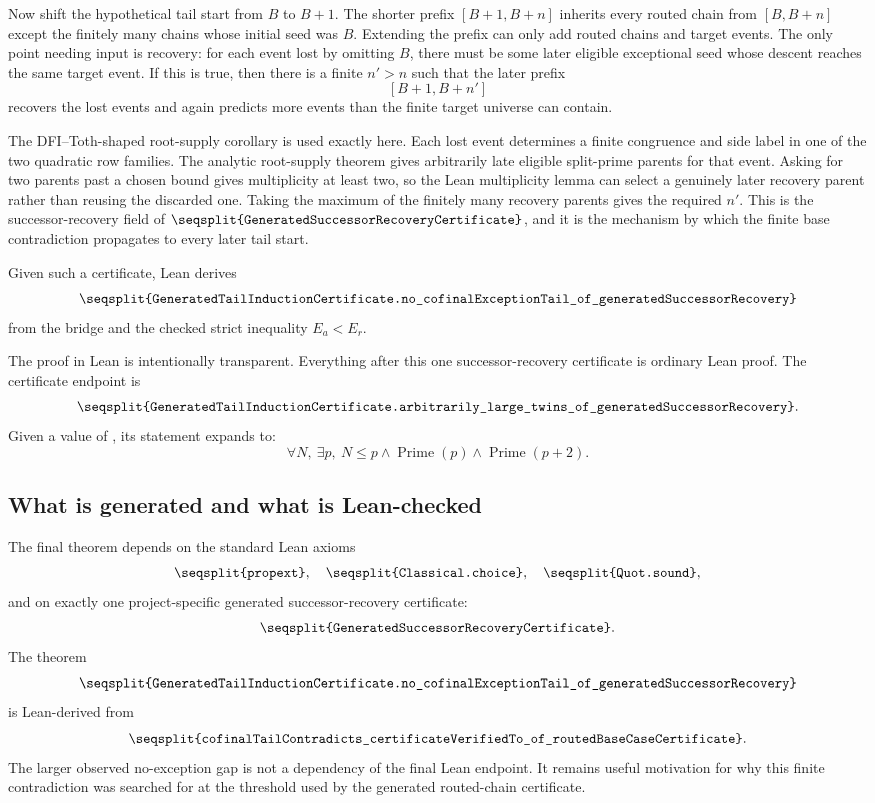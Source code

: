 \documentclass[11pt]{article}
\newcommand{\Prime}{\operatorname{Prime}}
\newcommand{\Lean}[1]{\texttt{\seqsplit{#1}}}
\begin{document}
Now shift the hypothetical tail start from \(B\) to \(B+1\).  The shorter
prefix \([B+1,B+n]\) inherits every routed chain from \([B,B+n]\) except the
finitely many chains whose initial seed was \(B\).  Extending the prefix can
only add routed chains and target events.  The only point needing input is
recovery: for each event lost by omitting \(B\), there must be some later
eligible exceptional seed whose descent reaches the same target event.  If this
is true, then there is a finite \(n'>n\) such that the later prefix
\[
  [B+1,B+n']
\]
recovers the lost events and again predicts more events than the finite target
universe can contain.

The DFI--Toth-shaped root-supply corollary is used exactly here.  Each lost
event determines a finite congruence and side label in one of the two quadratic
row families.  The analytic root-supply theorem gives arbitrarily late
eligible split-prime parents for that event.  Asking for two parents past a
chosen bound gives multiplicity at least two, so the Lean multiplicity lemma can
select a genuinely later recovery parent rather than reusing the discarded
one.  Taking the maximum of the finitely many recovery parents gives the
required \(n'\).  This is the successor-recovery field of
\(\Lean{GeneratedSuccessorRecoveryCertificate}\), and it is the mechanism by
which the finite base contradiction propagates to every later tail start.

Given such a certificate, Lean derives
\[
  \Lean{GeneratedTailInductionCertificate.no\_cofinalExceptionTail\_of\_generatedSuccessorRecovery}
\]
from the bridge and the checked strict inequality \(E_a<E_r\).

The proof in Lean is intentionally transparent.  Everything after this one
successor-recovery certificate is ordinary Lean proof.  The certificate endpoint is
\[
  \Lean{GeneratedTailInductionCertificate.arbitrarily\_large\_twins\_of\_generatedSuccessorRecovery}.
\]
Given a value of \Lean{GeneratedSuccessorRecoveryCertificate}, its statement expands to:
\[
  \forall N,\ \exists p,\ N\le p\wedge\Prime(p)\wedge\Prime(p+2).
\]

\subsection{What is generated and what is Lean-checked}

The final theorem depends on the standard Lean axioms
\[
  \Lean{propext},\quad \Lean{Classical.choice},\quad \Lean{Quot.sound},
\]
and on exactly one project-specific generated successor-recovery certificate:
\[
  \Lean{GeneratedSuccessorRecoveryCertificate}.
\]
The theorem
\[
  \Lean{GeneratedTailInductionCertificate.no\_cofinalExceptionTail\_of\_generatedSuccessorRecovery}
\]
is Lean-derived from
\[
  \Lean{cofinalTailContradicts\_certificateVerifiedTo\_of\_routedBaseCaseCertificate}.
\]
The larger observed no-exception gap is not a dependency of the final Lean
endpoint.  It remains useful motivation for why this finite contradiction was
searched for at the threshold used by the generated routed-chain certificate.
\end{document}
